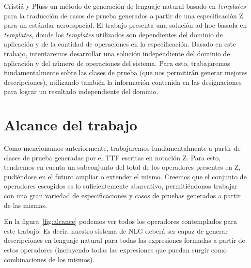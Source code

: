 Cristiá y Plüss \cite{cristia_pluss} un método de generación de lenguaje natural basado en \textit{templates} para la traducción de casos de prueba generados a partir de una especificación Z para un estándar aeroespacial. El trabajo presenta una solución ad-hoc basada en \textit{templates}, donde los \textit{templates} utilizados son dependientes del dominio de aplicación y de la cantidad de operaciones en la especificación. Basado en este trabajo, intentaremos desarrollar una solución independiente del dominio de aplicación y del número de operaciones del sistema. Para esto, trabajaremos fundamentalmente sobre las clases de prueba (que nos permitirán generar mejores descripciones), utilizando también la información contenida en las designaciones para lograr un resultado independiente del dominio.

\section{Alcance del trabajo}

Como mencionamos anteriormente, trabajaremos fundamentalmente a partir de clases de prueba generadas por el TTF escritas en notación Z.
Para esto, tendremos en cuenta un subconjunto del total de los operadores presentes en Z, pudiéndose en el futuro ampliar o extender el mismo. Creemos que el conjunto de operadores escogidos es lo suficientemente abarcativo, permitiéndonos trabajar con una gran variedad de especificaciones y casos de pruebas generados a partir de las mismas.

En la figura~\ref{fig:alcance} podemos ver todos los operadores contemplados para este trabajo. Es decir, nuestro sistema de NLG deberá ser capaz de generar descripciones en lenguaje natural para todas las expresiones formadas a partir de estos operadores (incluyendo todas las expresiones que puedan surgir como combinaciones de los mismos).

